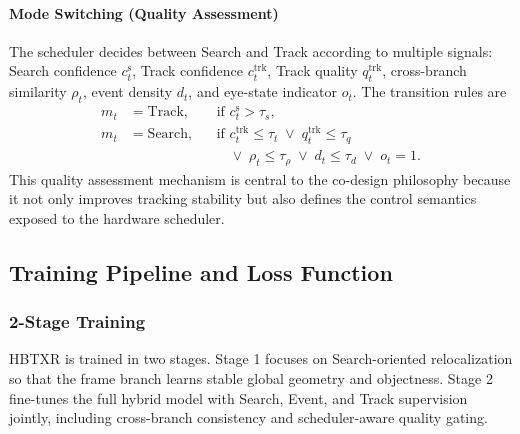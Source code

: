 \documentclass[journal]{IEEEtran}
\begin{document}
\paragraph*{Mode Switching (Quality Assessment)}
The scheduler decides between Search and Track according to multiple signals: Search confidence $c_t^{\mathrm{s}}$, Track confidence $c_t^{\mathrm{trk}}$, Track quality $q_t^{\mathrm{trk}}$, cross-branch similarity $\rho_t$, event density $d_t$, and eye-state indicator $o_t$. The transition rules are
\begin{align}
m_t &= \mathrm{Track}, && \text{if } c_t^{\mathrm{s}} > \tau_s, \\
m_t &= \mathrm{Search}, && \text{if } c_t^{\mathrm{trk}}\le\tau_t
\;\vee\; q_t^{\mathrm{trk}}\le\tau_q \nonumber\\
&&& \phantom{\text{if }} \vee\; \rho_t\le\tau_{\rho}
\;\vee\; d_t\le\tau_d
\;\vee\; o_t=1.
\end{align}
This quality assessment mechanism is central to the co-design philosophy because it not only improves tracking stability but also defines the control semantics exposed to the hardware scheduler.

\subsection{Training Pipeline and Loss Function}
\subsubsection{2-Stage Training}
HBTXR is trained in two stages. Stage 1 focuses on Search-oriented relocalization so that the frame branch learns stable global geometry and objectness. Stage 2 fine-tunes the full hybrid model with Search, Event, and Track supervision jointly, including cross-branch consistency and scheduler-aware quality gating.
\end{document}
